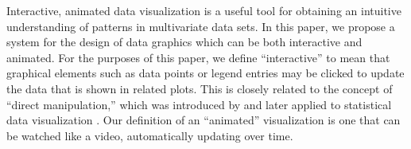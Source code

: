 \documentclass[journal]{vgtc}\usepackage[]{graphicx}\usepackage[]{color}
\begin{document}



Interactive, animated data visualization is a useful tool for
obtaining an intuitive understanding of patterns in multivariate data
sets. In this paper, we propose a system for the design of data
graphics which can be both interactive and animated. For the purposes
of this paper, we define ``interactive'' to mean that graphical
elements such as data points or legend entries may be clicked to update the data that is
shown in related plots. This is closely related to the concept of
``direct manipulation,'' which was introduced by \citet{shneiderman82}
and later applied to statistical data visualization
\citep{Hutchins:1985, brushing-scatterplots, cleveland}. Our
definition of an ``animated'' visualization is one that can be watched
like a video, automatically updating over time.

\end{document}
